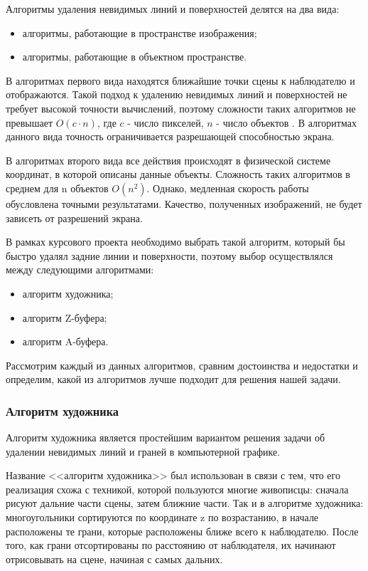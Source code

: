 \vspace{0.3cm}Алгоритмы удаления невидимых линий и поверхностей делятся на два вида:
\begin{itemize}
	\item алгоритмы, работающие в пространстве изображения;
	\item алгоритмы, работающие в объектном пространстве.
\end{itemize}

\vspace{0.3cm}В алгоритмах первого вида находятся ближайшие точки сцены к наблюдателю и отображаются. Такой подход к удалению невидимых линий и поверхностей не требует высокой точности вычислений, поэтому сложности таких алгоритмов не превышает $O(c \cdot n)$, где $c$ - число пикселей, $n$ - число объектов \cite{machinegraph}. В алгоритмах данного вида точность ограничивается разрешающей способностью экрана.

\vspace{0.3cm}В алгоритмах второго вида все действия происходят в физической системе координат, в которой описаны данные объекты. Сложность таких алгоритмов в среднем для n объектов $O(n^2)$\cite{machinegraph}. Однако, медленная скорость работы обусловлена точными результатами. Качество, полученных изображений, не будет зависеть от разрешений экрана.

\vspace{0.3cm}В рамках курсового проекта необходимо выбрать такой алгоритм, который бы быстро удалял задние линии и поверхности, поэтому выбор осуществлялся между следующими алгоритмами:
\begin{itemize}
	\item алгоритм художника;
	\item алгоритм Z-буфера;
	\item алгоритм A-буфера.
\end{itemize}
\vspace{0.3cm}Рассмотрим каждый из данных алгоритмов, сравним достоинства и недостатки и определим, какой из алгоритмов лучше подходит для решения нашей задачи.

\subsubsection{Алгоритм художника}
\hspace{0.6cm}Алгоритм художника является простейшим вариантом решения задачи об удалении невидимых линий и граней в компьютерной графике.

\vspace{0.3cm}Название <<алгоритм художника>> был использован в связи с тем, что его реализация схожа с техникой, которой пользуются многие живописцы: сначала рисуют дальние части сцены, затем ближние части. Так и в алгоритме художника: многоугольники сортируются по координате z по возрастанию, в начале расположены те грани, которые расположены ближе всего к наблюдателю. После того, как грани отсортированы по расстоянию от наблюдателя, их начинают отрисовывать на сцене, начиная с самых дальних.


